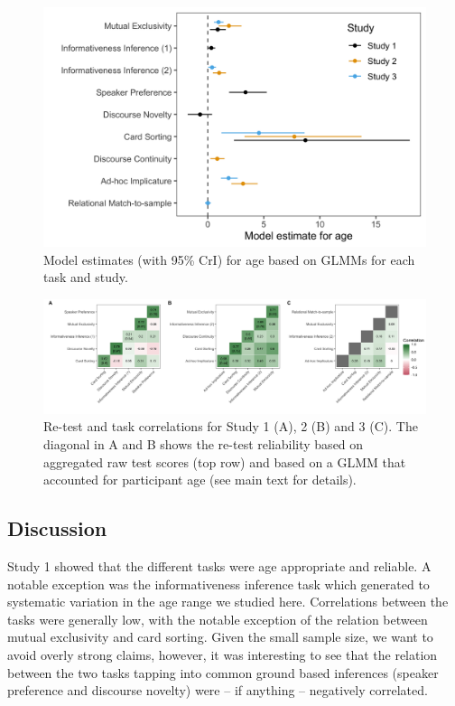 \documentclass[
  english,
  man,floatsintext]{apa6}
\begin{document}
\begin{figure}

{\centering \includegraphics[width=0.6\linewidth]{./figures/figure3} 

}

\caption{Model estimates (with 95\% CrI) for age based on GLMMs for each task and study.}\label{fig:fig3}
\end{figure}



\begin{figure}

{\centering \includegraphics[width=1\linewidth]{./figures/figure4} 

}

\caption{Re-test and task correlations for Study 1 (A), 2 (B) and 3 (C). The diagonal in A and B shows the re-test reliability based on aggregated raw test scores (top row) and based on a GLMM that accounted for participant age (see main text for details).}\label{fig:fig4}
\end{figure}

\hypertarget{discussion}{%
\subsection{Discussion}\label{discussion}}

Study 1 showed that the different tasks were age appropriate and reliable. A notable exception was the informativeness inference task which generated to systematic variation in the age range we studied here. Correlations between the tasks were generally low, with the notable exception of the relation between mutual exclusivity and card sorting. Given the small sample size, we want to avoid overly strong claims, however, it was interesting to see that the relation between the two tasks tapping into common ground based inferences (speaker preference and discourse novelty) were -- if anything -- negatively correlated.
\end{document}
